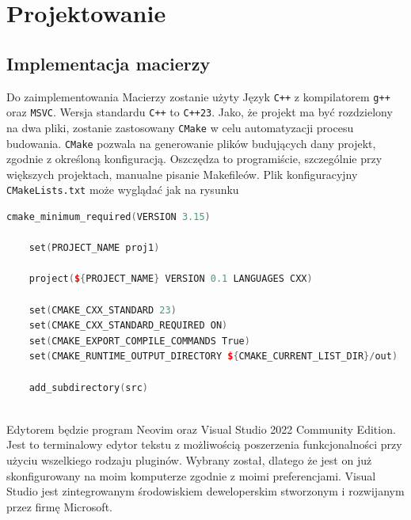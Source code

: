	\newpage
\section{Projektowanie}		%

\subsection{Implementacja macierzy}


Do zaimplementowania Macierzy zostanie użyty Język \texttt{C++} z kompilatorem \texttt{g++} oraz \texttt{MSVC}. Wersja standardu \texttt{C++} to \texttt{C++23}. Jako, że projekt ma być rozdzielony na dwa pliki, zostanie zastosowany \texttt{CMake} w celu automatyzacji procesu budowania. \texttt{CMake} pozwala na generowanie plików budujących dany projekt, zgodnie z określoną konfiguracją. Oszczędza to programiście, szczególnie przy większych projektach, manualne pisanie Makefileów.
Plik konfiguracyjny \texttt{CMakeLists.txt} może wyglądać jak na rysunku

\begin{lstlisting}[caption=Plik konfiguracyjny CMake, label={lst:cmakelists}, language=C++]
	cmake_minimum_required(VERSION 3.15)
	
	set(PROJECT_NAME proj1)
	
	project(${PROJECT_NAME} VERSION 0.1 LANGUAGES CXX)
	
	set(CMAKE_CXX_STANDARD 23)
	set(CMAKE_CXX_STANDARD_REQUIRED ON)
	set(CMAKE_EXPORT_COMPILE_COMMANDS True)
	set(CMAKE_RUNTIME_OUTPUT_DIRECTORY ${CMAKE_CURRENT_LIST_DIR}/out)
	
	add_subdirectory(src)
	
\end{lstlisting}

Edytorem będzie program Neovim oraz Visual Studio 2022 Community Edition. Jest to terminalowy edytor tekstu z możliwością poszerzenia funkcjonalności przy użyciu wszelkiego rodzaju pluginów. Wybrany został, dlatego że jest on już skonfigurowany na moim komputerze zgodnie z moimi preferencjami. Visual Studio jest zintegrowanym środowiskiem deweloperskim stworzonym i rozwijanym przez firmę Microsoft.

